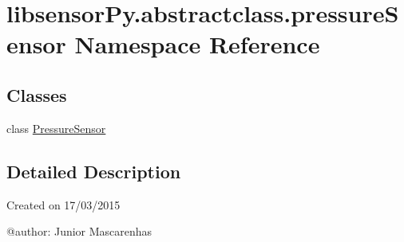 \hypertarget{namespacelibsensorPy_1_1abstractclass_1_1pressureSensor}{}\section{libsensor\+Py.\+abstractclass.\+pressure\+Sensor Namespace Reference}
\label{namespacelibsensorPy_1_1abstractclass_1_1pressureSensor}
\subsection*{Classes}
\begin{DoxyCompactItemize}
\item 
class \hyperlink{classlibsensorPy_1_1abstractclass_1_1pressureSensor_1_1PressureSensor}{Pressure\+Sensor}
\end{DoxyCompactItemize}


\subsection{Detailed Description}
\begin{DoxyVerb}Created on 17/03/2015

@author: Junior Mascarenhas
\end{DoxyVerb}
 